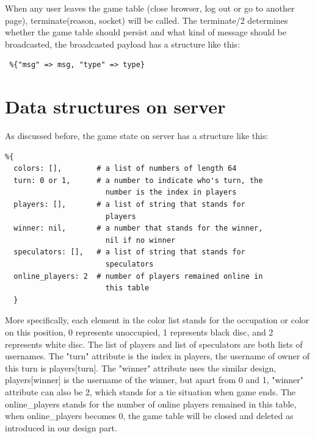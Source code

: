 When any user leaves the game table (close browser, log out or go to another 
page), terminate(reason, socket) will be called. The terminate/2 determines 
whether the game table should persist and what kind of message should be 
broadcasted, the broadcasted payload has a structure like this:

 \begin{lstlisting}
 %{"msg" => msg, "type" => type}
\end{lstlisting}


\section{Data structures on server}
As discussed before, the game state on server has a structure like this:
\begin{lstlisting}
%{ 
  colors: [],        # a list of numbers of length 64
  turn: 0 or 1,      # a number to indicate who's turn, the 
                       number is the index in players
  players: [],       # a list of string that stands for 
                       players
  winner: nil,       # a number that stands for the winner, 
                       nil if no winner
  speculators: [],   # a list of string that stands for 
                       speculators
  online_players: 2  # number of players remained online in 
                       this table
  }
\end{lstlisting}
More specifically, each element in the color list stands for the occupation or 
color on this position, 0 represents unoccupied, 1 represents black disc, and 
2 represents white disc. The list of players and list of speculators are both 
lists of usernames. The "turn" attribute is the index in players, the username 
of owner of this turn is players[turn]. The "winner" attribute uses the similar 
design, players[winner] is the username of the winner, but apart from 0 and 1, 
"winner" attribute can also be 2, which stands for a tie situation when game 
ends. The online\_players stands for the number of online players remained in 
this table, when online\_players becomes 0, the game table will be closed and 
deleted as introduced in our design part.

